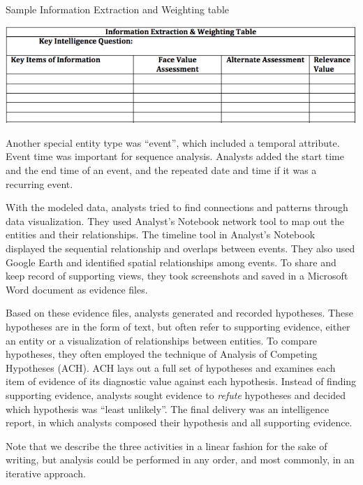 \begin{table}
	\caption{Sample Information Extraction and Weighting table}
	\label{tbl:iew_table}
	\includegraphics[width=\columnwidth]{./03-System/img/IEW_table.png}
\end{table}

Another special entity type was ``event'', which included a temporal attribute. Event time was important for sequence analysis. Analysts added the start time and the end time of an event, and the repeated date and time if it was a recurring event. 

With the modeled data, analysts tried to find connections and patterns through data visualization. They used Analyst's Notebook network tool to map out the entities and their relationships. The timeline tool in Analyst's Notebook displayed the sequential relationship and overlaps between events. They also used Google Earth and identified spatial relationships among events.  To share and keep record of supporting views, they took screenshots and saved in a Microsoft Word document as evidence files. 

Based on these evidence files, analysts generated and recorded hypotheses. These hypotheses are in the form of text, but often refer to supporting evidence, either an entity or a visualization of relationships between entities. To compare hypotheses, they often employed the technique of Analysis of Competing Hypotheses (ACH). ACH lays out a full set of hypotheses and examines each item of evidence of its diagnostic value against each hypothesis. Instead of finding supporting evidence, analysts sought evidence to \textit{refute} hypotheses and decided which hypothesis was ``least unlikely''. The final delivery was an intelligence report, in which analysts composed their hypothesis and all supporting evidence.

Note that we describe the three activities in a linear fashion for the sake of writing, but analysis could be performed in any order, and most commonly, in an iterative approach.

